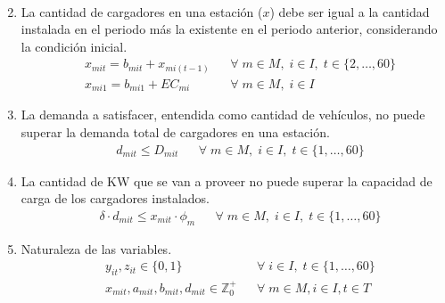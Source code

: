 \documentclass[letterpaper]{article}
\begin{document}
\begin{flushleft}
\begin{enumerate}
\begin{align*}
		      \end{align*}
		\item La cantidad de cargadores en una estaci\'on ($x$) debe ser igual a la cantidad instalada en el periodo más la existente en el periodo anterior, considerando la condici\'on inicial.
		      \begin{align*}
			       & x_{mit} = b_{mit} + x_{mi(t-1)} &  & \forall \; m \in M, \; i \in I, \; t \in \{2, \ldots, 60\} \\
			       & x_{mi1} = b_{mi1} + EC_{mi}     &  & \forall \; m \in M, \; i \in I
		      \end{align*}
		\item La demanda a satisfacer, entendida como cantidad de vehículos, no puede superar la demanda total de cargadores en una estación.
		      \begin{align*}
			       & d_{mit} \leq D_{mit} &  & \forall \; m \in M, \; i \in I, \; t \in \{1, \ldots, 60\}
		      \end{align*}
		\item La cantidad de KW que se van a proveer no puede superar la capacidad de carga de los cargadores instalados.
		      \begin{align*}
			       & \delta \cdot d_{mit} \leq x_{mit} \cdot \phi_m &  & \forall \; m \in M, \; i \in I, \; t \in \{1, \ldots, 60\}
		      \end{align*}
		\item Naturaleza de las variables.
		      \begin{align*}
			       & y_{it}, z_{it} \in \{0, 1\}                             &  & \forall \; i \in I, \; t \in \{1, \ldots, 60\} \\
			       & x_{mit}, a_{mit}, b_{mit}, d_{mit} \in \mathbb{Z}^{+}_0 &  & \forall \; m\in M, i\in I, t\in T
		      \end{align*}
	\end{enumerate}


\end{flushleft}
\end{document}
